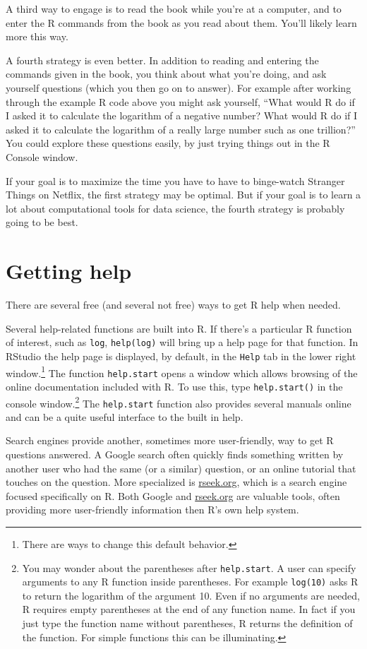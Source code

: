 A third way to engage is to read the book while you're at a computer, and to enter the R commands from the book as you read about them. You'll likely learn more this way.

A fourth strategy is even better. In addition to reading and entering the commands given in the book, you think about what you're doing, and ask yourself questions (which you then go on to answer). For example after working through the example R code above you might ask yourself, ``What would R do if I asked it to calculate the logarithm of a negative number? What would R do if I asked it to calculate the logarithm of a really large number such as one trillion?'' You could explore these questions easily, by just trying things out in the R Console window. 

If your goal is to maximize the time you have to have to binge-watch Stranger Things on Netflix, the first strategy may be optimal. But if your goal is to learn a lot about computational tools for data science, the fourth strategy is probably going to be best.

\section{Getting help}
There are several free (and several not free) ways to get R help when needed. 

Several help-related functions are built into R. If there's a particular R function of interest, such as \verb+log+, \verb+help(log)+ will bring up a help page for that function. In RStudio the help page is displayed, by default, in the \texttt{Help} tab in the lower right window.\footnote{There are ways to change this default behavior.} The function \verb+help.start+ opens a window which allows browsing of the online documentation included with R. To use this, type \verb+help.start()+ in the console window.\footnote{You may wonder about the parentheses after \texttt{help.start}. A user can specify arguments to any R function inside parentheses. For example \texttt{log(10)} asks R to return the logarithm of the argument 10. Even if no arguments are needed, R requires empty parentheses at the end of any function name. In fact if you just type the function name without parentheses, R returns the definition of the function. For simple functions this can be illuminating.} The \verb+help.start+ function also provides several manuals online and can be a quite useful interface to the built in help.

Search engines provide another, sometimes more user-friendly, way to get R questions answered. A Google search often quickly finds something written by another user who had the same (or a similar) question, or an online tutorial that touches on the question. More specialized is \url{rseek.org}, which is a search engine focused specifically on R. Both Google and \url{rseek.org} are valuable tools, often providing more user-friendly information then R's own help system.

